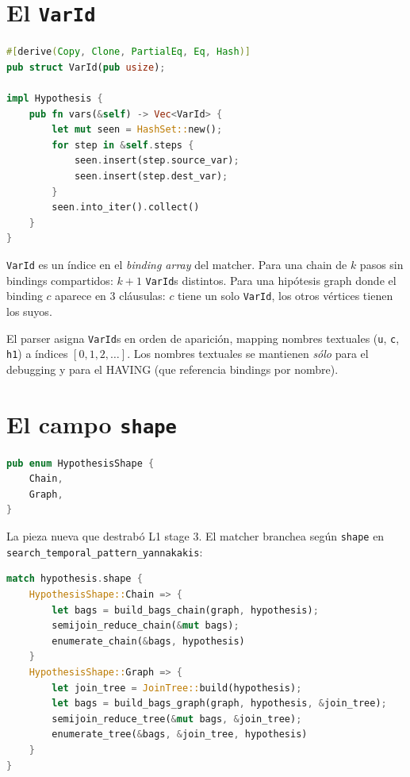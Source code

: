 \section{El \texttt{VarId}}

\begin{lstlisting}[language=Rust]
#[derive(Copy, Clone, PartialEq, Eq, Hash)]
pub struct VarId(pub usize);

impl Hypothesis {
    pub fn vars(&self) -> Vec<VarId> {
        let mut seen = HashSet::new();
        for step in &self.steps {
            seen.insert(step.source_var);
            seen.insert(step.dest_var);
        }
        seen.into_iter().collect()
    }
}
\end{lstlisting}

\noindent
\texttt{VarId} es un índice en el \emph{binding array} del matcher.
Para una chain de \(k\) pasos sin bindings compartidos: \(k + 1\)
\texttt{VarId}s distintos. Para una hipótesis graph donde el
binding \(c\) aparece en 3 cláusulas: \(c\) tiene un solo
\texttt{VarId}, los otros vértices tienen los suyos.

El parser asigna \texttt{VarId}s en orden de aparición, mapping
nombres textuales (\texttt{u}, \texttt{c}, \texttt{h1}) a índices
\([0, 1, 2, \dots]\). Los nombres textuales se mantienen \emph{sólo}
para el debugging y para el HAVING (que referencia bindings por
nombre).

\section{El campo \texttt{shape}}

\begin{lstlisting}[language=Rust]
pub enum HypothesisShape {
    Chain,
    Graph,
}
\end{lstlisting}

\noindent
La pieza nueva que destrabó L1 stage 3. El matcher branchea según
\texttt{shape} en \texttt{search\_temporal\_pattern\_yannakakis}:

\begin{lstlisting}[language=Rust]
match hypothesis.shape {
    HypothesisShape::Chain => {
        let bags = build_bags_chain(graph, hypothesis);
        semijoin_reduce_chain(&mut bags);
        enumerate_chain(&bags, hypothesis)
    }
    HypothesisShape::Graph => {
        let join_tree = JoinTree::build(hypothesis);
        let bags = build_bags_graph(graph, hypothesis, &join_tree);
        semijoin_reduce_tree(&mut bags, &join_tree);
        enumerate_tree(&bags, &join_tree, hypothesis)
    }
}
\end{lstlisting}

